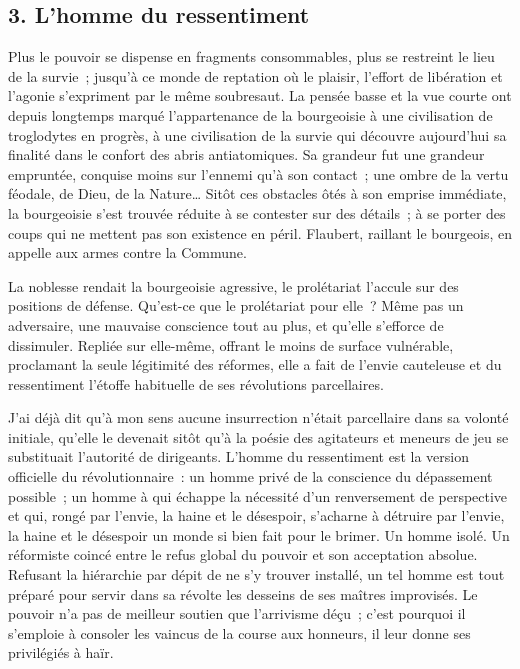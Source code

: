 \documentclass[french,twoside]{book} %
\begin{document}
\subsection[{3. L’homme du ressentiment}]{\textsc{3.} L’homme du ressentiment}
\noindent Plus le pouvoir se dispense en fragments consommables, plus se restreint le lieu de la survie ; jusqu’à ce monde de reptation où le plaisir, l’effort de libération et l’agonie s’expriment par le même soubresaut. La pensée basse et la vue courte ont depuis longtemps marqué l’appartenance de la bourgeoisie à une civilisation de troglodytes en progrès, à une civilisation de la survie qui découvre aujourd’hui sa finalité dans le confort des abris antiatomiques. Sa grandeur fut une grandeur empruntée, conquise moins sur l’ennemi qu’à son contact ; une ombre de la vertu féodale, de Dieu, de la Nature… Sitôt ces obstacles ôtés à son emprise immédiate, la bourgeoisie s’est trouvée réduite à se contester sur des détails ; à se porter des coups qui ne mettent pas son existence en péril. Flaubert, raillant le bourgeois, en appelle aux armes contre la Commune.\par
La noblesse rendait la bourgeoisie agressive, le prolétariat l’accule sur des positions de défense. Qu’est-ce que le prolétariat pour elle ? Même pas un adversaire, une mauvaise conscience tout au plus, et qu’elle s’efforce de dissimuler. Repliée sur elle-même, offrant le moins de surface vulnérable, proclamant la seule légitimité des réformes, elle a fait de l’envie cauteleuse et du ressentiment l’étoffe habituelle de ses révolutions parcellaires.\par
J’ai déjà dit qu’à mon sens aucune insurrection n’était parcellaire dans sa volonté initiale, qu’elle le devenait sitôt qu’à la poésie des agitateurs et meneurs de jeu se substituait l’autorité de dirigeants. L’homme du ressentiment est la version officielle du révolutionnaire : un homme privé de la conscience du dépassement possible ; un homme à qui échappe la nécessité d’un renversement de perspective et qui, rongé par l’envie, la haine et le désespoir, s’acharne à détruire par l’envie, la haine et le désespoir un monde si bien fait pour le brimer. Un homme isolé. Un réformiste coincé entre le refus global du pouvoir et son acceptation absolue. Refusant la hiérarchie par dépit de ne s’y trouver installé, un tel homme est tout préparé pour servir dans sa révolte les desseins de ses maîtres improvisés. Le pouvoir n’a pas de meilleur soutien que l’arrivisme déçu ; c’est pourquoi il s’emploie à consoler les vaincus de la course aux honneurs, il leur donne ses privilégiés à haïr.\par
\end{document}

